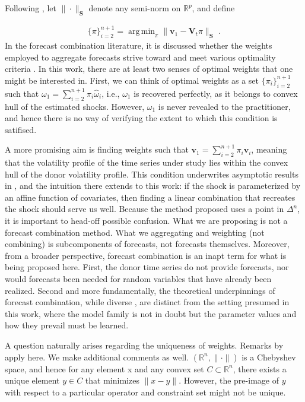 \documentclass[11pt]{article}
\newcommand{\V}{\textbf{V}}
\newcommand{\weight}{\pi}
\DeclareMathOperator*{\argmin}{arg\,min} %
\theoremstyle{definition}
\begin{document}
    Following \citet{abadie2003economic,abadie2010synthetic}, let $\|\cdot\|_{\textbf{S}}$ denote any semi-norm on $\mathbb{R}^{p}$, and define

    \begin{align*}
    \{\pi\}_{i=2}^{n+1} = \argmin_{\pi}\|\textbf{v}_{1} - \V_{t}\pi \|_{\textbf{S}} \text{ .}
    \end{align*}
In the forecast combination literature, it is discussed whether the weights employed to aggregate forecasts strive toward and meet various optimality criteria \citep{timmermann2006forecast,wang2023forecast}.  In this work, there are at least two senses of optimal weights that one might be interested in.  First, we can think of optimal weights as a set $\{\weight_{i}\}_{i=2}^{n+1}$ such that $\omega_{1} = \sum^{n+1}_{i=2}\weight_{i}\hat\omega_{i}$, i.e., $\omega_{1}$ is recovered perfectly, as it belongs to convex hull of the estimated shocks. However, $\omega_{1}$ is never revealed to the practitioner, and hence there is no way of verifying the extent to which this condition is satifised.

A more promising aim is finding weights such that $\textbf{v}_{1} = \sum^{n+1}_{i=2}\weight_{i}\textbf{v}_{i}$, meaning that the volatility profile of the time series under study lies within the convex hull of the donor volatility profile.  This condition underwrites asymptotic results in \citet{abadie2010synthetic}, and the intuition there extends to this work: if the shock is parameterized by an affine function of covariates, then finding a linear combination that recreates the shock should serve us well.  Because the method proposed uses a point in $\Delta^{n}$, it is important to head-off possible confusion.  What we are proposing is not a forecast combination method.  What we aggregating and weighting (not combining) is subcomponents of forecasts, not forecasts themselves.  Moreover, from a broader perspective, forecast combination is an inapt term for what is being proposed here.  First, the donor time series do not provide forecasts, nor would forecasts been needed for random variables that have already been realized.  Second and more fundamentally, the theoretical underpinnings of forecast combination, while diverse \citep{wang2023forecast}, are distinct from the setting presumed in this work, where the model family is not in doubt but the parameter values and how they prevail must be learned.

A question naturally arises regarding the uniqueness of weights.  Remarks by \cite{lin2021minimizing, abadie2022synthetic} apply here.  We make additional comments as well. $(\mathbb{R}^{n}, \|\cdot\|)$ is a Chebyshev space, and hence for any element x and any convex set $C\subset \mathbb{R}^{n}$, there exists a unique element $y\in C$ that minimizes $\|x-y\|$.  However, the pre-image of $y$ with respect to a particular operator and constraint set might not be unique.
\end{document}
